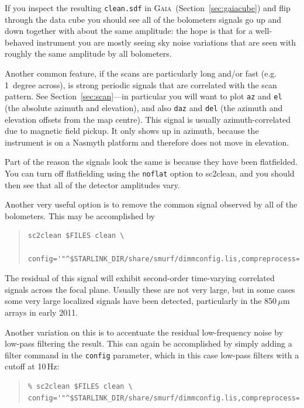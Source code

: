 \documentclass[twoside,11pt]{article}
\newcommand{\htmlref}[2]{#1}
\newcommand{\latexhtml}[2]{#1}
\newcommand{\xref}[3]{#1}
\renewcommand{\_}{\texttt{\symbol{95}}}
\newenvironment{myquote}{\begin{quote}\begin{small}}{\end{small}\end{quote}}
\newcommand{\gaia}{\xref{\textsc{Gaia}}{sun214}{}}
\newcommand{\task}[1]{\textsf{#1}}
\newcommand{\cref}[3]{\latexhtml{#1~\ref{#2}}{\htmlref{#3}{#2}}}
\begin{document}
If you inspect the resulting \texttt{clean.sdf} in \gaia\
(\cref{Section}{sec:gaiacube}{Displaying time-series data}) and flip
through the data cube you should
see all of the bolometers signals go up and down together with about
the same amplitude: the hope is that for a well-behaved instrument you
are mostly seeing sky noise variations that are seen with roughly the
same amplitude by all bolometers.

Another common feature, if the scans are particularly long and/or fast
(e.g. 1~degree across), is strong periodic signals that are correlated
with the scan pattern. See \cref{Section}{sec:scan}{Displaying scan
patterns}---in particular
you will want to plot \texttt{az} and \texttt{el} (the absolute
azimuth and elevation), and also \texttt{daz} and \texttt{del} (the
azimuth and elevation offsets from the map centre). This signal is
usually azimuth-correlated due to magnetic field pickup. It only shows
up in azimuth, because the instrument is on a Nasmyth platform and
therefore does not move in elevation.

Part of the reason the signals look the same is because they have been
flatfielded. You can turn off flatfielding using the \texttt{noflat}
option to \task{sc2clean}, and you should then see that all of the detector
amplitudes vary.

Another very useful option is to remove the common signal observed by
all of the bolometers. This may be accomplished by

\begin{myquote}
\begin{verbatim}
sc2clean $FILES clean \
   config='"^$STARLINK_DIR/share/smurf/dimmconfig.lis,compreprocess=1"'
\end{verbatim}
\end{myquote}

The residual of this signal will exhibit second-order time-varying
correlated signals across the focal plane. Usually these are not very
large, but in some cases some very large localized signals have been
detected, particularly in the 850\,$\mu$m arrays in early 2011.

Another variation on this is to accentuate the residual low-frequency
noise by low-pass filtering the result. This can again be accomplished
by simply adding a filter command in the \texttt{config} parameter,
which in this case low-pass filters with a cutoff at 10\,Hz:

\begin{myquote}
\begin{verbatim}
% sc2clean $FILES clean \
config='"^$STARLINK_DIR/share/smurf/dimmconfig.lis,compreprocess=1,filt_edgelow=10"'
\end{verbatim}
\end{myquote}
\end{document}
